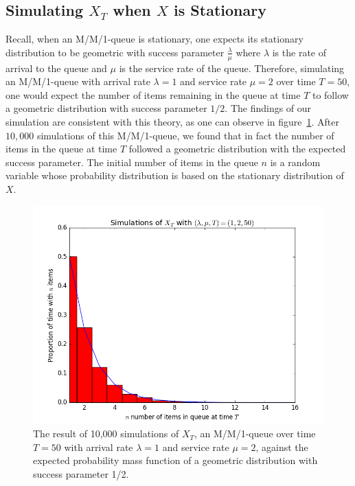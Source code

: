 \documentclass[11pt, oneside]{article}
\begin{document}
\subsection{Simulating $X_T$ when $X$ is Stationary}
Recall, when an M/M/1-queue is stationary, one expects its stationary distribution to be geometric with success parameter $\frac{\lambda}{\mu}$ where $\lambda$ is the rate of arrival to the queue and $\mu$ is the service rate of the queue. Therefore, simulating an M/M/1-queue with arrival rate $\lambda=1$ and service rate $\mu=2$ over time $T=50$, one would expect the number of items remaining in the queue at time $T$ to follow a geometric distribution with success parameter $1/2$. The findings of our simulation are consistent with this theory, as one can observe in figure~\ref{fig:items}. After $10,000$ simulations of this M/M/1-queue, we found that in fact the number of items in the queue at time $T$ followed a geometric distribution with the expected success parameter. The initial number of items in the queue $n$ is a random variable whose probability distribution is based on the stationary distribution of $X$.
\begin{figure}[H]
\includegraphics[scale=0.6]{simulation_xt}
\caption{The result of 10,000 simulations of $X_T$, an M/M/1-queue over time $T=50$ with arrival rate $\lambda=1$ and service rate $\mu=2$, against the expected probability mass function of a geometric distribution with success parameter 1/2.}
\label{fig:items}
\end{figure}
\end{document}
